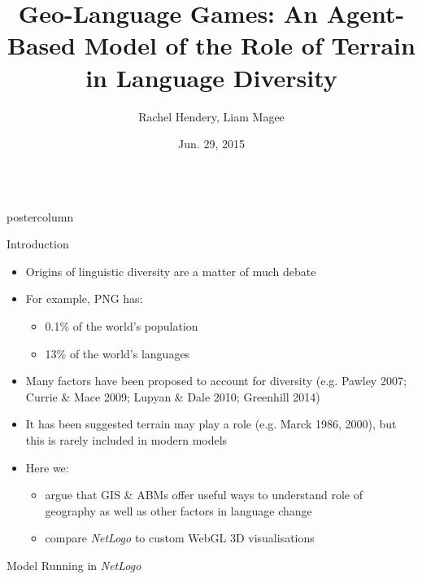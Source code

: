 \documentclass[final,hyperref={pdfpagelabels=false}]{beamer}
\title{\huge Geo-Language Games: An Agent-Based Model of the Role of Terrain in Language Diversity}
\author{Rachel Hendery, Liam Magee}
\institute[University of Western Sydney]{Digital Humanities Research Group, University of Western Sydney, Parramatta, Australia}
\date[Jun. 29, 2015]{Jun. 29, 2015}
\newlength{\columnheight}
\begin{document}
\begin{frame}
  \begin{columns}[T]
    \begin{column}{.33\textwidth}
      \begin{beamercolorbox}[center,wd=\textwidth]{postercolumn}
        \begin{minipage}[T]{.95\textwidth}  %
          \parbox[t][\columnheight]{\textwidth}{ %
            \begin{block}{Introduction}
              \begin{itemize}
              \item Origins of linguistic diversity are a matter of much debate
              \item For example, PNG has:
                \begin{itemize}
                \item 0.1\% of the world's population
                \item 13\% of the world's languages
                \end{itemize}
              \item Many factors have been proposed to account for diversity (e.g. Pawley 2007; Currie \& Mace 2009; Lupyan \& Dale 2010; Greenhill 2014)
              \item It has been suggested terrain may play a role (e.g. Marck 1986, 2000), but this is rarely included in modern models
              \item Here we:
              \begin{itemize}
            \item argue that GIS \& ABMs offer useful ways to understand role of geography as well as other factors in language change
              \item compare \textit{NetLogo} to custom WebGL 3D visualisations \end{itemize}
              \end{itemize}
            \end{block}
            \vfill
            \begin{block}{Model Running in \textit{NetLogo}}

\end{block}}
\end{minipage}
\end{beamercolorbox}
\end{column}
\end{columns}
\end{frame}
\end{document}
